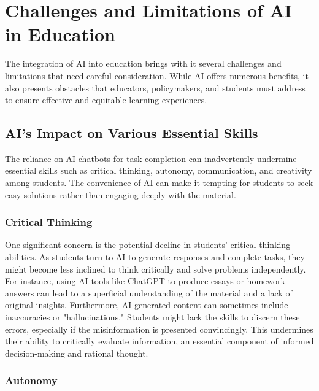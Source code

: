 \documentclass{article}
\begin{document}



\newpage

\section{Challenges and Limitations of AI in Education}

The integration of AI into education brings with it several
challenges and limitations that need careful consideration.
While AI offers numerous benefits, it also presents obstacles
that educators, policymakers, and students must address
to ensure effective and equitable learning experiences.

\subsection{AI's Impact on Various Essential Skills}

The reliance on AI chatbots for task completion can inadvertently
undermine essential skills such as critical thinking, autonomy,
communication, and creativity among students. The convenience of
AI can make it tempting for students to seek easy solutions
rather than engaging deeply with the material.

\subsubsection{Critical Thinking}

One significant concern is the potential decline in students'
critical thinking abilities. As students turn to AI to generate
responses and complete tasks, they might become less inclined
to think critically and solve problems independently.
For instance, using AI tools like ChatGPT to produce essays
or homework answers can lead to a superficial understanding
of the material and a lack of original insights. Furthermore,
AI-generated content can sometimes include inaccuracies
or "hallucinations." Students might lack the skills to discern
these errors, especially if the misinformation is presented
convincingly. This undermines their ability to critically evaluate
information, an essential component of informed decision-making
and rational thought.

\subsubsection{Autonomy}
\end{document}
